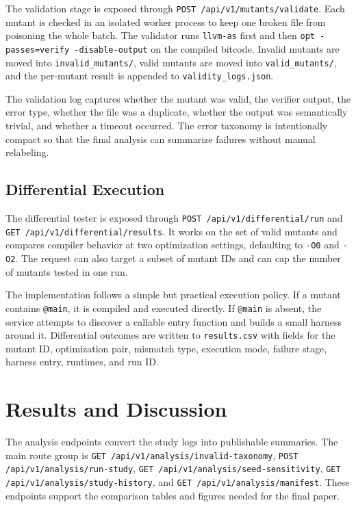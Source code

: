\documentclass[journal]{IEEEtran}
\begin{document}
The validation stage is exposed through \texttt{POST /api/v1/mutants/validate}. Each mutant is checked in an isolated worker process to keep one broken file from poisoning the whole batch. The validator runs \texttt{llvm-as} first and then \texttt{opt -passes=verify -disable-output} on the compiled bitcode. Invalid mutants are moved into \texttt{invalid\_mutants/}, valid mutants are moved into \texttt{valid\_mutants/}, and the per-mutant result is appended to \texttt{validity\_logs.json}.

The validation log captures whether the mutant was valid, the verifier output, the error type, whether the file was a duplicate, whether the output was semantically trivial, and whether a timeout occurred. The error taxonomy is intentionally compact so that the final analysis can summarize failures without manual relabeling.

\subsection{Differential Execution}

The differential tester is exposed through \texttt{POST /api/v1/differential/run} and \texttt{GET /api/v1/differential/results}. It works on the set of valid mutants and compares compiler behavior at two optimization settings, defaulting to \texttt{-O0} and \texttt{-O2}. The request can also target a subset of mutant IDs and can cap the number of mutants tested in one run.

The implementation follows a simple but practical execution policy. If a mutant contains \texttt{@main}, it is compiled and executed directly. If \texttt{@main} is absent, the service attempts to discover a callable entry function and builds a small harness around it. Differential outcomes are written to \texttt{results.csv} with fields for the mutant ID, optimization pair, mismatch type, execution mode, failure stage, harness entry, runtimes, and run ID.

\section{Results and Discussion}

The analysis endpoints convert the study logs into publishable summaries. The main route group is \texttt{GET /api/v1/analysis/invalid-taxonomy}, \texttt{POST /api/v1/analysis/run-study}, \texttt{GET /api/v1/analysis/seed-sensitivity}, \texttt{GET /api/v1/analysis/study-history}, and \texttt{GET /api/v1/analysis/manifest}. These endpoints support the comparison tables and figures needed for the final paper.
\end{document}
